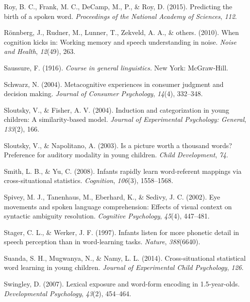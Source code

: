 \documentclass[english,floatsintext,man]{apa6}
\theoremstyle{definition}
\theoremstyle{definition}
\theoremstyle{definition}
\theoremstyle{remark}
\begin{document}
\hypertarget{ref-roy2015}{}
Roy, B. C., Frank, M. C., DeCamp, M., P., \& Roy, D. (2015). Predicting
the birth of a spoken word. \emph{Proceedings of the National Academy of
Sciences}, \emph{112}.

\hypertarget{ref-ronnberg2010}{}
Rönnberg, J., Rudner, M., Lunner, T., Zekveld, A. A., \& others. (2010).
When cognition kicks in: Working memory and speech understanding in
noise. \emph{Noise and Health}, \emph{12}(49), 263.

\hypertarget{ref-saussure1916}{}
Saussure, F. (1916). \emph{Course in general linguistics.} New York:
McGraw-Hill.

\hypertarget{ref-schwarz2004}{}
Schwarz, N. (2004). Metacognitive experiences in consumer judgment and
decision making. \emph{Journal of Consumer Psychology}, \emph{14}(4),
332--348.

\hypertarget{ref-sloutsky2004}{}
Sloutsky, V., \& Fisher, A. V. (2004). Induction and categorization in
young children: A similarity-based model. \emph{Journal of Experimental
Psychology: General}, \emph{133}(2), 166.

\hypertarget{ref-sloutsky2003}{}
Sloutsky, V., \& Napolitano, A. (2003). Is a picture worth a thousand
words? Preference for auditory modality in young children. \emph{Child
Development}, \emph{74}.

\hypertarget{ref-smith08}{}
Smith, L. B., \& Yu, C. (2008). Infants rapidly learn word-referent
mappings via cross-situational statistics. \emph{Cognition},
\emph{106}(3), 1558--1568.

\hypertarget{ref-spivey2002}{}
Spivey, M. J., Tanenhaus, M., Eberhard, K., \& Sedivy, J. C. (2002). Eye
movements and spoken language comprehension: Effects of visual context
on syntactic ambiguity resolution. \emph{Cognitive Psychology},
\emph{45}(4), 447--481.

\hypertarget{ref-stager1997}{}
Stager, C. L., \& Werker, J. F. (1997). Infants listen for more phonetic
detail in speech perception than in word-learning tasks. \emph{Nature},
\emph{388}(6640).

\hypertarget{ref-suanda2014}{}
Suanda, S. H., Mugwanya, N., \& Namy, L. L. (2014). Cross-situational
statistical word learning in young children. \emph{Journal of
Experimental Child Psychology}, \emph{126}.

\hypertarget{ref-Swingley2007}{}
Swingley, D. (2007). Lexical exposure and word-form encoding in
1.5-year-olds. \emph{Developmental Psychology}, \emph{43}(2), 454--464.
\end{document}
